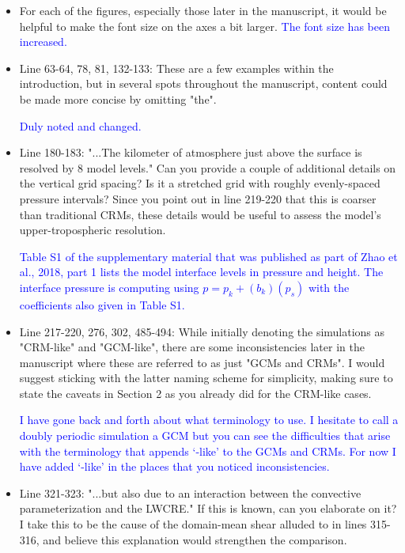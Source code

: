 \documentclass[draft]{agujournal2019}
\begin{document}
\begin{itemize}
  \item For each of the figures, especially those later in the manuscript, it would be helpful to make the font size on the axes a bit larger.
  \textcolor{blue}{The font size has been increased.}
  
  \item Line 63-64, 78, 81, 132-133: These are a few examples within the introduction, but in several spots throughout the manuscript, content could be made more concise by omitting "the".  
  
  \textcolor{blue}{Duly noted and changed.}
  
  \item Line 180-183: "...The kilometer of atmosphere just above the surface is resolved by 8 model levels." Can you provide a couple of additional details on the vertical grid spacing? Is it a stretched grid with roughly evenly-spaced pressure intervals? Since you point out in line 219-220 that this is coarser than traditional CRMs, these details would be useful to assess the model's upper-tropospheric resolution.  
  
  \textcolor{blue}{Table S1 of the supplementary material that was published as part of Zhao et al., 2018, part 1 lists the model interface levels in pressure and height.  The interface pressure is computing using $p=p_k+(b_k)(p_s)$ with the coefficients also given in Table S1.}
  
  \item Line 217-220, 276, 302, 485-494: While initially denoting the simulations as "CRM-like" and "GCM-like", there are some inconsistencies later in the manuscript where these are referred to as just "GCMs and CRMs". I would suggest sticking with the latter naming scheme for simplicity, making sure to state the caveats in Section 2 as you already did for the CRM-like cases.  
  
  \textcolor{blue}{I have gone back and forth about what terminology to use.  I hesitate to call a doubly periodic simulation a GCM but you can see the difficulties that arise with the terminology that appends ‘-like’ to the GCMs and CRMs.  For now I have added ‘-like’ in the places that you noticed inconsistencies. }
  
  \item Line 321-323: "...but also due to an interaction between the convective parameterization and the LWCRE." If this is known, can you elaborate on it? I take this to be the cause of the domain-mean shear alluded to in lines 315-316, and believe this explanation would strengthen the comparison.
  

\end{itemize}
\end{document}
